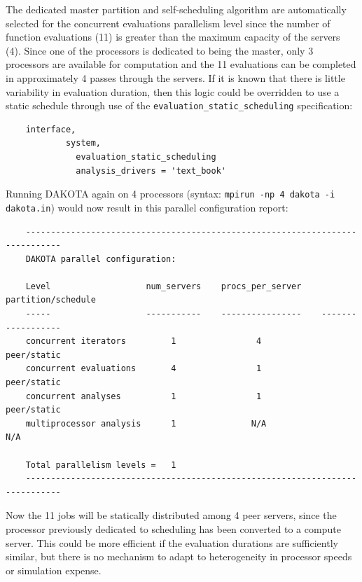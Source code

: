 The dedicated master partition and self-scheduling algorithm are
automatically selected for the concurrent evaluations parallelism
level since the number of function evaluations (11) is greater than
the maximum capacity of the servers (4). Since one of the processors
is dedicated to being the master, only 3 processors are available for
computation and the 11 evaluations can be completed in approximately 4
passes through the servers. If it is known that there is little
variability in evaluation duration, then this logic could be
overridden to use a static schedule through use of the
\texttt{evaluation\_static\_scheduling} specification:
\begin{small}
\begin{verbatim}
    interface,
            system,
              evaluation_static_scheduling
              analysis_drivers = 'text_book'
\end{verbatim}
\end{small}

Running DAKOTA again on 4 processors (syntax: \texttt{mpirun -np 4
  dakota -i dakota.in}) would now result in this parallel
configuration report:
\begin{small}
\begin{verbatim}
    -----------------------------------------------------------------------------
    DAKOTA parallel configuration:

    Level                   num_servers    procs_per_server    partition/schedule
    -----                   -----------    ----------------    ------------------
    concurrent iterators         1                4              peer/static
    concurrent evaluations       4                1              peer/static
    concurrent analyses          1                1              peer/static
    multiprocessor analysis      1               N/A                N/A

    Total parallelism levels =   1
    -----------------------------------------------------------------------------
\end{verbatim}
\end{small}

Now the 11 jobs will be statically distributed among 4 peer servers,
since the processor previously dedicated to scheduling has been
converted to a compute server. This could be more efficient if the
evaluation durations are sufficiently similar, but there is no
mechanism to adapt to heterogeneity in processor speeds or simulation
expense.

